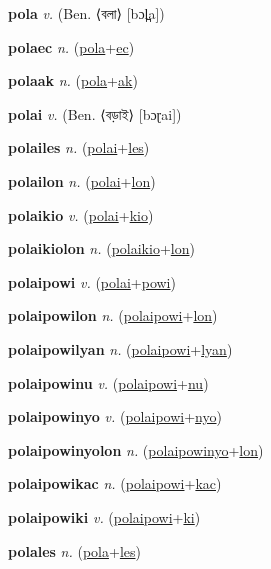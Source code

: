 \textbf{\hypertarget{pola}{pola}} \textit{v.} (Ben. ⟨{\bengali{}বলা}⟩ [bɔl̪a])


\textbf{\hypertarget{polaec}{polaec}} \textit{n.} (\hyperlink{pola}{pola}+\allowbreak \hyperlink{ec}{ec})


\textbf{\hypertarget{polaak}{polaak}} \textit{n.} (\hyperlink{pola}{pola}+\allowbreak \hyperlink{ak}{ak})


\textbf{\hypertarget{polai}{polai}} \textit{v.} (Ben. ⟨{\bengali{}বড়াই}⟩ [bɔɽai])


\textbf{\hypertarget{polailes}{polailes}} \textit{n.} (\hyperlink{polai}{polai}+\allowbreak \hyperlink{les}{les})


\textbf{\hypertarget{polailon}{polailon}} \textit{n.} (\hyperlink{polai}{polai}+\allowbreak \hyperlink{lon}{lon})


\textbf{\hypertarget{polaikio}{polaikio}} \textit{v.} (\hyperlink{polai}{polai}+\allowbreak \hyperlink{kio}{kio})


\textbf{\hypertarget{polaikiolon}{polaikiolon}} \textit{n.} (\hyperlink{polaikio}{polaikio}+\allowbreak \hyperlink{lon}{lon})


\textbf{\hypertarget{polaipowi}{polaipowi}} \textit{v.} (\hyperlink{polai}{polai}+\allowbreak \hyperlink{powi}{powi})


\textbf{\hypertarget{polaipowilon}{polaipowilon}} \textit{n.} (\hyperlink{polaipowi}{polaipowi}+\allowbreak \hyperlink{lon}{lon})


\textbf{\hypertarget{polaipowilyan}{polaipowilyan}} \textit{n.} (\hyperlink{polaipowi}{polaipowi}+\allowbreak \hyperlink{lyan}{lyan})


\textbf{\hypertarget{polaipowinu}{polaipowinu}} \textit{v.} (\hyperlink{polaipowi}{polaipowi}+\allowbreak \hyperlink{nu}{nu})


\textbf{\hypertarget{polaipowinyo}{polaipowinyo}} \textit{v.} (\hyperlink{polaipowi}{polaipowi}+\allowbreak \hyperlink{nyo}{nyo})


\textbf{\hypertarget{polaipowinyolon}{polaipowinyolon}} \textit{n.} (\hyperlink{polaipowinyo}{polaipowinyo}+\allowbreak \hyperlink{lon}{lon})


\textbf{\hypertarget{polaipowikac}{polaipowikac}} \textit{n.} (\hyperlink{polaipowi}{polaipowi}+\allowbreak \hyperlink{kac}{kac})


\textbf{\hypertarget{polaipowiki}{polaipowiki}} \textit{v.} (\hyperlink{polaipowi}{polaipowi}+\allowbreak \hyperlink{ki}{ki})


\textbf{\hypertarget{polales}{polales}} \textit{n.} (\hyperlink{pola}{pola}+\allowbreak \hyperlink{les}{les})


